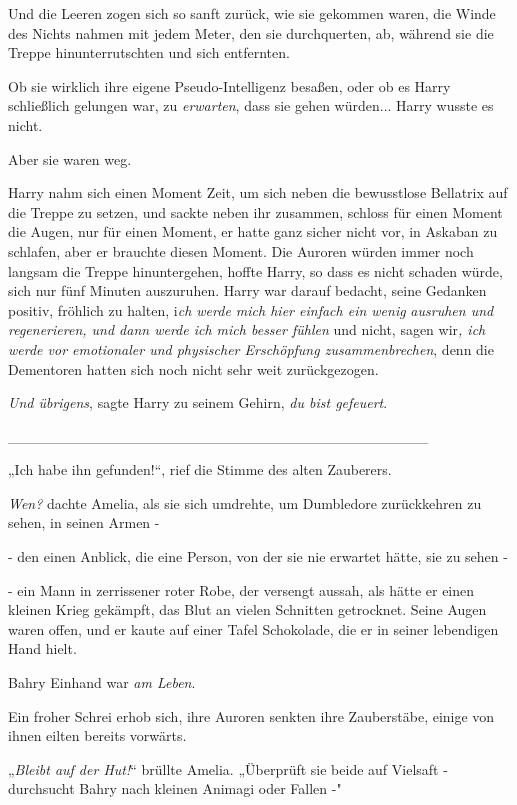 {Und die Leeren zogen sich so sanft zurück, wie sie gekommen waren, die Winde des Nichts nahmen mit jedem Meter, den sie durchquerten, ab, während sie die Treppe hinunterrutschten und sich entfernten.

Ob sie wirklich ihre eigene Pseudo-Intelligenz besaßen, oder ob es Harry schließlich gelungen war, zu \emph{erwarten}, dass sie gehen würden... Harry wusste es nicht.

Aber sie waren weg.

Harry nahm sich einen Moment Zeit, um sich neben die bewusstlose Bellatrix auf die Treppe zu setzen, und sackte neben ihr zusammen, schloss für einen Moment die Augen, nur für einen Moment, er hatte ganz sicher nicht vor, in Askaban zu schlafen, aber er brauchte diesen Moment. Die Auroren würden immer noch langsam die Treppe hinuntergehen, hoffte Harry, so dass es nicht schaden würde, sich nur fünf Minuten auszuruhen. Harry war darauf bedacht, seine Gedanken positiv, fröhlich zu halten, i\emph{ch werde mich hier einfach ein wenig} \emph{ausruhen und} \emph{regenerieren, und dann werde ich mich besser fühlen} und nicht, sagen wir\emph{, ich werde vor emotionaler und physischer Erschöpfung zusammenbrechen}, denn die Dementoren hatten sich noch nicht sehr weit zurückgezogen.

\emph{Und übrigens}, sagte Harry zu seinem Gehirn, \emph{du bist gefeuert}.

\_\_\_\_\_\_\_\_\_\_\_\_\_\_\_\_\_\_\_\_\_\_\_\_\_\_\_\_\_\_\_\_\_\_\_\_\_\_\_\_

„Ich habe ihn gefunden!“, rief die Stimme des alten Zauberers.

\emph{Wen?} dachte Amelia, als sie sich umdrehte, um Dumbledore zurückkehren zu sehen, in seinen Armen -

- den einen Anblick, die eine Person, von der sie nie erwartet hätte, sie zu sehen -

- ein Mann in zerrissener roter Robe, der versengt aussah, als hätte er einen kleinen Krieg gekämpft, das Blut an vielen Schnitten getrocknet. Seine Augen waren offen, und er kaute auf einer Tafel Schokolade, die er in seiner lebendigen Hand hielt.

Bahry Einhand war \emph{am Leben}.

Ein froher Schrei erhob sich, ihre Auroren senkten ihre Zauberstäbe, einige von ihnen eilten bereits vorwärts.

„\emph{Bleibt auf der Hut!}“ brüllte Amelia. „Überprüft sie beide auf Vielsaft - durchsucht Bahry nach kleinen Animagi oder Fallen -"

}
